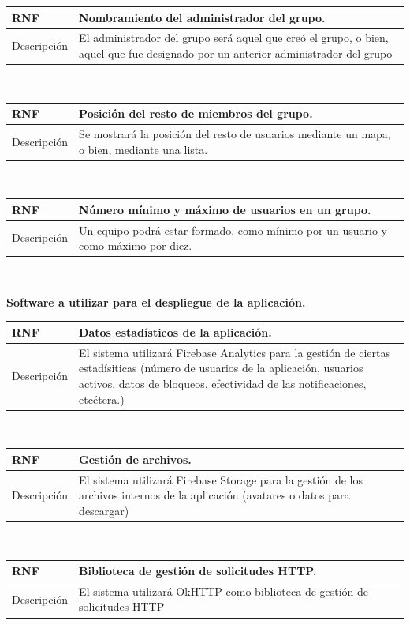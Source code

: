\documentclass[twoside]{report}
\newcommand\addrow[2]{#1 &#2\\ }
\newcommand\addheading[2]{#1 &#2\\ \hline}
\newcommand\tabularhead{\begin{tabular}{lp{0.7\textwidth}}
\hline
}
\newenvironment{req}{\tabularhead}
{\hline\end{tabular}}
\begin{document}
\begin{req}
	\addheading{\textbf{RNF\arabic{nonFunctionalRequirements}}}{Nombramiento del administrador del grupo.}
	\addrow{Descripción}{El administrador del grupo será aquel que creó el grupo, o bien, aquel que fue designado por un anterior administrador del grupo}
\end{req}\\

\begin{req}
	\addheading{\textbf{RNF\arabic{nonFunctionalRequirements}}}{Posición del resto de miembros del grupo.}
	\addrow{Descripción}{Se mostrará la posición del resto de usuarios mediante un mapa, o bien, mediante una lista.}
\end{req}\\

\begin{req}
	\addheading{\textbf{RNF\arabic{nonFunctionalRequirements}}}{Número mínimo y máximo de usuarios en un grupo.}
	\addrow{Descripción}{Un equipo podrá estar formado, como mínimo por un usuario y como máximo por diez.}
\end{req}\\

\textbf{Software a utilizar para el despliegue de la aplicación.}\\

\begin{req}
	\addheading{\textbf{RNF\arabic{nonFunctionalRequirements}}}{Datos estadísticos de la aplicación.}
	\addrow{Descripción}{El sistema utilizará Firebase Analytics para la gestión de ciertas estadísiticas (número de usuarios de la aplicación, usuarios activos, datos de bloqueos, efectividad de las notificaciones, etcétera.)}
\end{req}\\

\begin{req}
	\addheading{\textbf{RNF\arabic{nonFunctionalRequirements}}}{Gestión de archivos.}
	\addrow{Descripción}{El sistema utilizará Firebase Storage para la gestión de los archivos internos de la aplicación (avatares o datos para descargar)}
\end{req}\\

\begin{req}
	\addheading{\textbf{RNF\arabic{nonFunctionalRequirements}}}{Biblioteca de gestión de solicitudes HTTP.}
	\addrow{Descripción}{El sistema utilizará OkHTTP como biblioteca de gestión de solicitudes HTTP}
\end{req}\\
\end{document}
